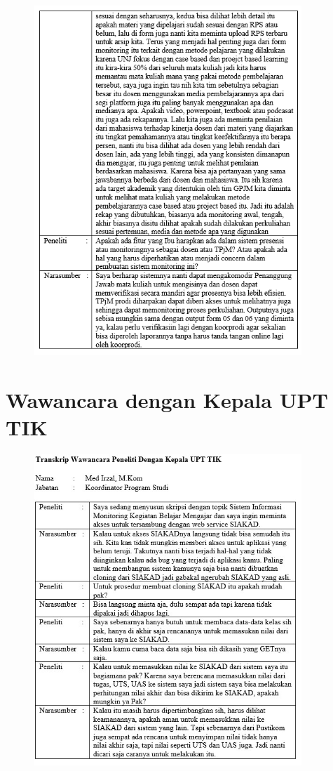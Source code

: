 \begin{figure}[H]
	\centering
	\includegraphics[width=0.9\textwidth]{gambar/lampiran/UR-5}	
\end{figure}

\chapter{Wawancara dengan Kepala UPT TIK}

\begin{figure}[H]
	\centering
	\includegraphics[width=0.9\textwidth]{gambar/lampiran/Wawancara Upt TIK}	
\end{figure}
